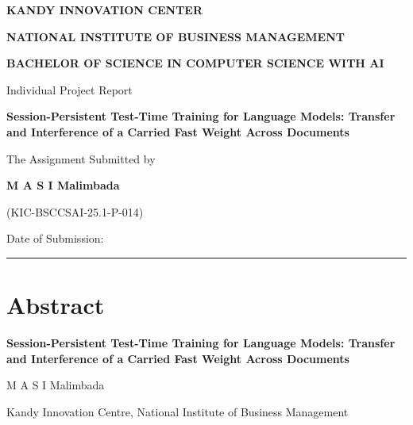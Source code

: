 \documentclass[12pt,a4paper]{report}
\newcommand{\reporttitle}{Session-Persistent Test-Time Training for Language Models: Transfer and Interference of a Carried Fast Weight Across Documents}
\newcommand{\authorname}{M A S I Malimbada}
\newcommand{\regno}{KIC-BSCCSAI-25.1-P-014}
\newcommand{\affiliation}{Kandy Innovation Centre, National Institute of Business Management}
\newcommand{\authoremail}{[email address]}
\newcommand{\submissiondate}{\rule{4cm}{0.4pt}}
\begin{document}
\begin{titlepage}
\centering
\vspace*{1cm}
{\bfseries\Large KANDY INNOVATION CENTER\par}
\vspace{0.3cm}
{\bfseries\Large NATIONAL INSTITUTE OF BUSINESS MANAGEMENT\par}
\vspace{0.3cm}
{\bfseries\large BACHELOR OF SCIENCE IN COMPUTER SCIENCE WITH AI\par}
\vspace{2.5cm}
{\Large Individual Project Report\par}
\vspace{2.5cm}
{\LARGE\bfseries \reporttitle\par}
\vspace{3cm}
{\large The Assignment Submitted by\par}
\vspace{0.4cm}
{\large\bfseries \authorname\par}
{\large (\regno)\par}
\vfill
{\large Date of Submission: \submissiondate\par}
\end{titlepage}

\setcounter{page}{2}

\chapter*{Abstract}

\begin{center}
{\bfseries \reporttitle\par}
\vspace{0.3cm}
\authorname\par
\affiliation\par
\authoremail\par
\end{center}
\vspace{0.3cm}
\end{document}
